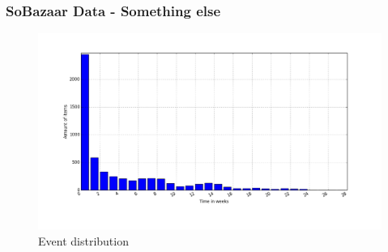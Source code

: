 \documentclass{beamer}
\begin{document}
  \begin{frame}
    \frametitle{SoBazaar Data - Something else}
    \begin{figure}[H]
        \includegraphics[width=5in]{../src/image/itemTimespansdistribution.png}
        \centering
        \caption{Event distribution}
    \label{figure:eventIDDistribution}
    \end{figure}
  \end{frame}
\end{document}
